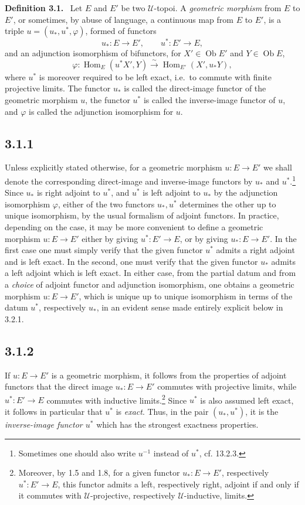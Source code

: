 \documentclass[11pt]{article}
\newcommand{\U}{\mathcal{U}}
\newcommand{\Hom}{\operatorname{Hom}}
\newcommand{\Ob}{\operatorname{Ob}}
\newcommand{\ie}{i.e.}
\newenvironment{statement}[1]{\par\medskip\noindent\textbf{#1.}\ }{\par\medskip}
\providecommand{\Ob}{\operatorname{Ob}}
\begin{document}
\begin{statement}{Definition 3.1}
Let \(E\) and \(E'\) be two \(\U\)-topoi. A \emph{geometric morphism} from \(E\) to \(E'\), or sometimes, by abuse of language, a continuous map from \(E\) to \(E'\), is a triple \(u=(u_\ast,u^\ast,\varphi)\), formed of functors
\[
u_\ast:E\longrightarrow E',\qquad u^\ast:E'\longrightarrow E,
\]
and an adjunction isomorphism of bifunctors, for \(X'\in\Ob E'\) and \(Y\in\Ob E\),
\[
\varphi:\Hom_E(u^\ast X',Y)\xrightarrow{\sim}\Hom_{E'}(X',u_\ast Y),
\]
where \(u^\ast\) is moreover required to be left exact, \ie\ to commute with finite projective limits. The functor \(u_\ast\) is called the direct-image functor of the geometric morphism \(u\), the functor \(u^\ast\) is called the inverse-image functor of \(u\), and \(\varphi\) is called the adjunction isomorphism for \(u\).
\end{statement}

\subsection*{3.1.1}
Unless explicitly stated otherwise, for a geometric morphism \(u:E\to E'\) we shall denote the corresponding direct-image and inverse-image functors by \(u_\ast\) and \(u^\ast\).\footnote{Sometimes one should also write \(u^{-1}\) instead of \(u^\ast\), cf. 13.2.3.} Since \(u_\ast\) is right adjoint to \(u^\ast\), and \(u^\ast\) is left adjoint to \(u_\ast\) by the adjunction isomorphism \(\varphi\), either of the two functors \(u_\ast,u^\ast\) determines the other up to unique isomorphism, by the usual formalism of adjoint functors. In practice, depending on the case, it may be more convenient to define a geometric morphism \(u:E\to E'\) either by giving \(u^\ast:E'\to E\), or by giving \(u_\ast:E\to E'\). In the first case one must simply verify that the given functor \(u^\ast\) admits a right adjoint and is left exact. In the second, one must verify that the given functor \(u_\ast\) admits a left adjoint which is left exact. In either case, from the partial datum and from a \emph{choice} of adjoint functor and adjunction isomorphism, one obtains a geometric morphism \(u:E\to E'\), which is unique up to unique isomorphism in terms of the datum \(u^\ast\), respectively \(u_\ast\), in an evident sense made entirely explicit below in 3.2.1.

\subsection*{3.1.2}
If \(u:E\to E'\) is a geometric morphism, it follows from the properties of adjoint functors that the direct image \(u_\ast:E\to E'\) commutes with projective limits, while \(u^\ast:E'\to E\) commutes with inductive limits.\footnote{Moreover, by 1.5 and 1.8, for a given functor \(u_\ast:E\to E'\), respectively \(u^\ast:E'\to E\), this functor admits a left, respectively right, adjoint if and only if it commutes with \(\U\)-projective, respectively \(\U\)-inductive, limits.} Since \(u^\ast\) is also assumed left exact, it follows in particular that \(u^\ast\) is \emph{exact}. Thus, in the pair \((u_\ast,u^\ast)\), it is the \emph{inverse-image functor \(u^\ast\)} which has the strongest exactness properties.
\end{document}
